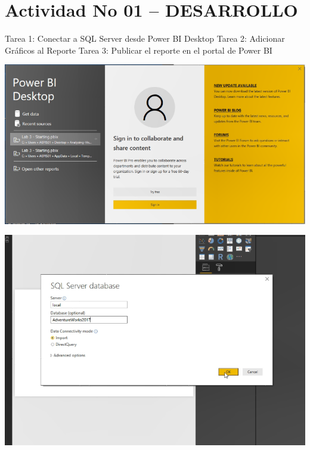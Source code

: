 \section{Actividad No 01 – DESARROLLO} 

Tarea 1: Conectar a SQL Server desde Power BI Desktop 
Tarea 2: Adicionar Gráficos al Reporte
Tarea 3: Publicar el reporte en el portal de Power BI

	\begin{center}
	\includegraphics[width=15cm]{./Imagenes/img1}
	\end{center}	

	\begin{center}
	\includegraphics[width=18cm]{./Imagenes/img2}
	\end{center}

